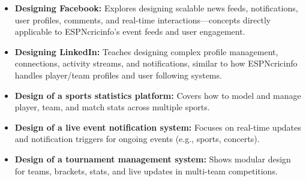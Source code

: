 \begin{itemize}
\item
\protect{}\label{RB41F0mj1X4hwBiZH_bSi}
\textbf{Designing Facebook:} Explores designing scalable news feeds, notifications, user profiles, comments, and real-time interactions---concepts directly applicable to ESPNcricinfo's event feeds and user engagement.
\item
\protect{}\label{rCExCsUrUnBhhgfH6L22x}
\textbf{Designing LinkedIn:} Teaches designing complex profile management, connections, activity streams, and notifications, similar to how ESPNcricinfo handles player/team profiles and user following systems.
\item
\protect{}\label{eekF-JDcG5watgLWIDStr}
\textbf{Design of a sports statistics platform:} Covers how to model and manage player, team, and match stats across multiple sports.
\item
\protect{}\label{Mh0n0WLWT9KtDYddyGSjT}
\textbf{Design of a live event notification system:} Focuses on real-time updates and notification triggers for ongoing events (e.g., sports, concerts).
\item
\protect{}\label{9-JzQRsI6T94q6LrA-IBN}
\textbf{Design of a tournament management system:} Shows modular design for teams, brackets, stats, and live updates in multi-team competitions.
\end{itemize}

